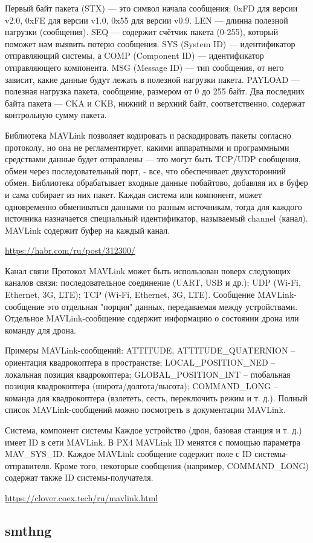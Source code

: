 Первый байт пакета (STX) — это символ начала сообщения: 0xFD для версии v2.0, 0xFE для версии v1.0, 0x55 для версии v0.9. LEN — длинна полезной нагрузки (сообщения). SEQ — содержит счётчик пакета (0-255), который поможет нам выявить потерю сообщения. SYS (System ID) — идентификатор отправляющий системы, а COMP (Component ID) — идентификатор отправляющего компонента. MSG (Message ID) — тип сообщения, от него зависит, какие данные будут лежать в полезной нагрузки пакета. PAYLOAD — полезная нагрузка пакета, сообщение, размером от 0 до 255 байт. Два последних байта пакета — CKA и CKB, нижний и верхний байт, соответственно, содержат контрольную сумму пакета.

Библиотека MAVLink позволяет кодировать и раскодировать пакеты согласно протоколу, но она не регламентирует, какими аппаратными и программными средствами данные будет отправлены — это могут быть TCP/UDP сообщения, обмен через последовательный порт, - все, что обеспечивает двухсторонний обмен. Библиотека обрабатывает входные данные побайтово, добавляя их в буфер и сама собирает из них пакет. Каждая система или компонент, может одновременно обмениваться данными по разным источникам, тогда для каждого источника назначается специальный идентификатор, называемый channel (канал). MAVLink содержит буфер на каждый канал.

\url{https://habr.com/ru/post/312300/}

Канал связи
Протокол MAVLink может быть использован поверх следующих каналов связи:
последовательное соединение (UART, USB и др.);
UDP (Wi-Fi, Ethernet, 3G, LTE);
TCP (Wi-Fi, Ethernet, 3G, LTE).
Сообщение
MAVLink-сообщение это отдельная "порция" данных, передаваемая между устройствами. Отдельное MAVLink-сообщение содержит информацию о состоянии дрона или команду для дрона.

Примеры MAVLink-сообщений:
ATTITUDE, ATTITUDE\_QUATERNION – ориентация квадрокоптера в пространстве;
LOCAL\_POSITION\_NED – локальная позиция квадрокоптера;
GLOBAL\_POSITION\_INT – глобальная позиция квадрокоптера (широта/долгота/высота);
COMMAND\_LONG – команда для квадрокоптера (взлететь, сесть, переключить режим и т. д.).
Полный список MAVLink-сообщений можно посмотреть в документации MAVLink.

Система, компонент системы
Каждое устройство (дрон, базовая станция и т. д.) имеет ID в сети MAVLink. В PX4 MAVLink ID менятся с помощью параметра MAV\_SYS\_ID. Каждое MAVLink сообщение содержит поле с ID системы-отправителя. Кроме того, некоторые сообщения (например, COMMAND\_LONG) содержат также ID системы-получателя.

\url{https://clover.coex.tech/ru/mavlink.html}

\subsection{smthng}
